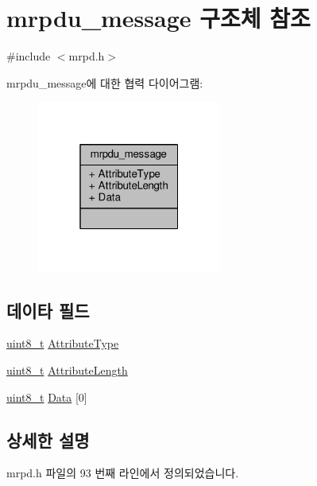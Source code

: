 \hypertarget{structmrpdu__message}{}\section{mrpdu\+\_\+message 구조체 참조}
\label{structmrpdu__message}


{\ttfamily \#include $<$mrpd.\+h$>$}



mrpdu\+\_\+message에 대한 협력 다이어그램\+:
\nopagebreak
\begin{figure}[H]
\begin{center}
\leavevmode
\includegraphics[width=172pt]{structmrpdu__message__coll__graph}
\end{center}
\end{figure}
\subsection*{데이타 필드}
\begin{DoxyCompactItemize}
\item 
\hyperlink{stdint_8h_aba7bc1797add20fe3efdf37ced1182c5}{uint8\+\_\+t} \hyperlink{structmrpdu__message_a3dd83acf51706885c5b37387a958a010}{Attribute\+Type}
\item 
\hyperlink{stdint_8h_aba7bc1797add20fe3efdf37ced1182c5}{uint8\+\_\+t} \hyperlink{structmrpdu__message_a5f2b49cd60c758023398b61c08f28e94}{Attribute\+Length}
\item 
\hyperlink{stdint_8h_aba7bc1797add20fe3efdf37ced1182c5}{uint8\+\_\+t} \hyperlink{structmrpdu__message_a365ab2667948b1615e9662e639e27dcb}{Data} \mbox{[}0\mbox{]}
\end{DoxyCompactItemize}


\subsection{상세한 설명}


mrpd.\+h 파일의 93 번째 라인에서 정의되었습니다.



